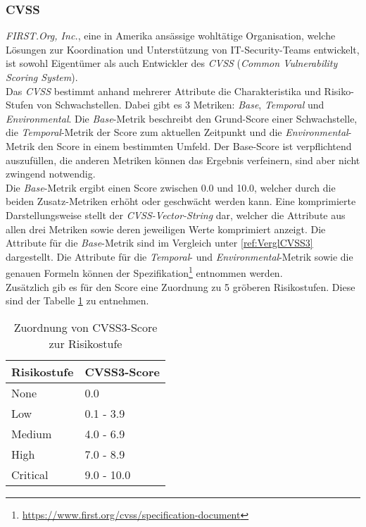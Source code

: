			\subsubsection{CVSS}
			\textit{FIRST.Org, Inc.}, eine in Amerika ansässige wohltätige Organisation, welche Lösungen zur Koordination und Unterstützung von IT-Security-Teams entwickelt, ist sowohl Eigentümer als auch Entwickler des \textit{CVSS} (\textit{Common Vulnerability Scoring System}).\\
			
			Das \textit{CVSS} bestimmt anhand mehrerer Attribute die Charakteristika und Risiko-Stufen von Schwachstellen. Dabei gibt es 3 Metriken: \textit{Base}, \textit{Temporal} und \textit{Environmental}. Die \textit{Base}-Metrik beschreibt den Grund-Score einer Schwachstelle, die \textit{Temporal}-Metrik der Score zum aktuellen Zeitpunkt und die  \textit{Environmental}-Metrik den Score in einem bestimmten Umfeld. Der Base-Score ist verpflichtend auszufüllen, die anderen Metriken können das Ergebnis verfeinern, sind aber nicht zwingend notwendig.\cite{FIRSTCVSS}\\
			
			Die \textit{Base}-Metrik ergibt einen Score zwischen 0.0 und 10.0, welcher durch die beiden Zusatz-Metriken erhöht oder geschwächt werden kann. Eine komprimierte Darstellungsweise stellt der \textit{CVSS-Vector-String} dar, welcher die Attribute aus allen drei Metriken sowie deren jeweiligen Werte komprimiert anzeigt. Die Attribute für die \textit{Base}-Metrik sind im Vergleich unter \ref{ref:VerglCVSS3} dargestellt. Die Attribute für die \textit{Temporal}- und \textit{Environmental}-Metrik sowie die genauen Formeln können der Spezifikation\footnote{\url{https://www.first.org/cvss/specification-document}} entnommen werden.\cite{FIRSTCVSS}\\
		
		Zusätzlich gib es für den Score eine Zuordnung zu 5 gröberen Risikostufen. Diese sind der Tabelle \ref{tab:cvssToRisk} zu entnehmen.\\
		
		\begin{table}
			\centering
			\begin{tabularx}{5cm}{l | l}
				Risikostufe & CVSS3-Score \\\hline
				None & 0.0 \\
				Low & 0.1 - 3.9 \\
				Medium & 4.0 - 6.9 \\
				High & 7.0 - 8.9 \\
				Critical & 9.0 - 10.0	 \\
			\end{tabularx}
			\caption{Zuordnung von CVSS3-Score zur Risikostufe
			\label{tab:cvssToRisk}
 \cite{FIRSTCVSSSpec}}
		\end{table}
		
